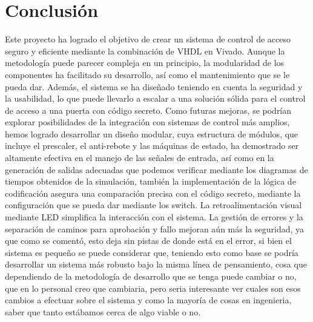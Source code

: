 \documentclass[a4paper, 12pt]{article}
\newcommand{\control}{img/control.jpg}
\begin{document}
    \section{Conclusión}
    Este proyecto ha logrado el objetivo de crear un sistema de control de acceso seguro y eficiente mediante la combinación de VHDL en Vivado. Aunque la metodología puede parecer compleja en un principio, la modularidad de los componentes ha facilitado su desarrollo, así como el mantenimiento que se le pueda dar. Además, el sistema se ha diseñado teniendo en cuenta la seguridad y la usabilidad, lo que puede llevarlo a escalar a una solución sólida para el control de acceso a una puerta con código secreto. Como futuras mejoras, se podrían explorar posibilidades de la integración con sistemas de control más amplios, hemos logrado desarrollar un diseño modular, cuya estructura de módulos, que incluye el prescaler, el anti-rebote y las máquinas de estado, ha demostrado ser altamente efectiva en el manejo de las señales de entrada, así como en la generación de salidas adecuadas que podemos verificar mediante los diagramas de tiempos obtenidos de la simulación, también la implementación de la lógica de codificación asegura una comparación precisa con el código secreto, mediante la configuración que se pueda dar mediante los switch. La retroalimentación visual mediante LED simplifica la interacción con el sistema. La gestión de errores y la separación de caminos para aprobación y fallo mejoran aún más la seguridad, ya que como se comentó, esto deja sin pistas de donde está en el error, si bien el sistema es pequeño se puede considerar que, teniendo esto como base se podría desarrollar un sistema más robusto bajo la misma línea de pensamiento, cosa que dependiendo de la metodología de desarrollo que se tenga puede cambiar o no, que en lo personal creo que cambiaria, pero seria interesante ver cuales son esos cambios a efectuar sobre el sistema y como la mayoría de cosas en ingenieria, saber que tanto estábamos cerca de algo viable o no.   




    
\end{document}
